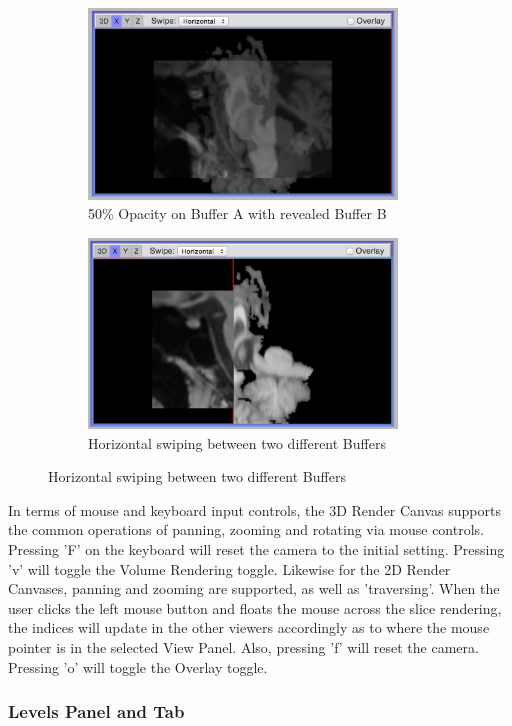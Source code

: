 \documentclass[a4paper,11pt,twoside]{article}
\begin{document}
\begin{figure}
\centering
\begin{subfigure}{.5\textwidth}
  \centering
  \includegraphics[width=82mm]{graphics/BufferOpacity_01.png}
  \caption{50\% Opacity on Buffer A with revealed Buffer B}
\end{subfigure}%
\begin{subfigure}{.5\textwidth}
  \centering
  \includegraphics[width=82mm]{graphics/Swipe_01.png}
  \caption{Horizontal swiping between two different Buffers}
\end{subfigure}
\end{figure}




In terms of mouse and keyboard input controls, the 3D Render Canvas supports the common operations of panning, zooming and rotating via mouse controls. Pressing 'F' on the keyboard will reset the camera to the initial setting. Pressing 'v' will toggle the Volume Rendering toggle. Likewise for the 2D Render Canvases, panning and zooming are supported, as well as 'traversing'. When the user clicks the left mouse button and floats the mouse across the slice rendering, the indices will update in the other viewers accordingly as to where the mouse pointer is in the selected View Panel. Also, pressing 'f' will reset the camera. Pressing 'o' will toggle the Overlay toggle.




\subsubsection{Levels Panel and Tab}
\end{document}
